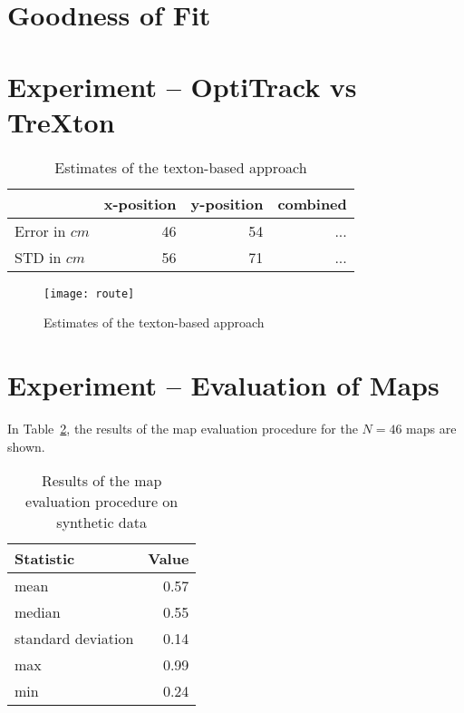 \section{Goodness of Fit}


\section{Experiment -- OptiTrack vs TreXton}
\label{sec:experiment-2}

\begin{table}[H]
  \centering
  \begin{tabular}{lrrr}
    \toprule
    & x-position & y-position & combined\\
    \midrule
    Error in $cm$ & 46 & 54 & ...\\
    STD in $cm$ & 56 & 71  & ...\\
    \bottomrule
  \end{tabular}
  \caption[Estimates of the texton-based approach]{Estimates of the texton-based approach}
  \label{tab:targetlanding}
\end{table}
\begin{figure}
\texttt{[image: route]}
  \caption[Estimates of the texton-based approach]{Estimates of the texton-based approach}
  \label{fig:route}
\end{figure}

\section{Experiment -- Evaluation of Maps}
\label{sec:experiment-3}

In Table~\ref{tab:mapeval}, the results of the map evaluation
procedure for the $N = 46$ maps are shown.

\begin{table}[h]
  \centering
  \begin{tabular}{lr}
    \toprule
    Statistic & Value\\
    \midrule
    mean & 0.57\\
    median & 0.55\\
    standard deviation & 0.14\\
    max & 0.99\\
    min & 0.24\\    
    \bottomrule
  \end{tabular}
  \caption[Map evaluation procedure on synthetic data]{Results of the map evaluation procedure on synthetic data}
  \label{tab:mapeval}

\end{table}

